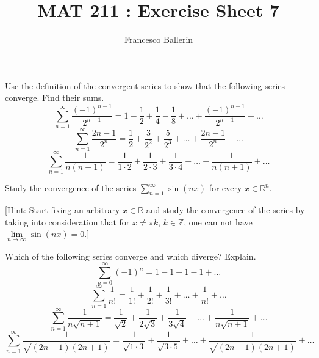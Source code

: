 \documentclass[11pt]{article}%
\title{MAT 211 : Exercise Sheet 7}
\author{Francesco Ballerin}
\date{\color{gray}{\small{francesco.ballerin@uib.no}}}
\begin{document}
\begin{minipage}[t]{\dimexpr \textwidth-6cm-\columnsep}
     \maketitle
\end{minipage}
\hfill\noindent{}

\vspace{50pt}

\begin{Exercise}[title=**$\dagger$] Use the definition of the convergent series to show that the following series converge. Find their sums. $$\sum_{n=1}^{\infty}\frac{(-1)^{n-1}}{2^{n-1}}=1-\frac{1}{2}+\frac{1}{4}-\frac{1}{8}+\ldots+\frac{(-1)^{n-1}}{2^{n-1}}+\ldots$$ $$\sum_{n=1}^{\infty}\frac{2n-1}{2^n}=\frac{1}{2}+\frac{3}{2^2}+\frac{5}{2^3}+\ldots+\frac{2n-1}{2^n}+\ldots$$ $$\sum_{n=1}^{\infty}\frac{1}{n(n+1)}=\frac{1}{1\cdot 2}+\frac{1}{2\cdot 3}+\frac{1}{3\cdot 4}+\ldots+\frac{1}{n(n+1)}+\ldots$$
\end{Exercise}

\begin{Exercise}[title=*] Study the convergence of the series $\sum_{n=1}^{\infty}\sin (nx)$ for every $x\in\mathbb R^n$. 
\end{Exercise}


[Hint: Start fixing an arbitrary $x\in\mathbb R$ and study the convergence of the series by taking into consideration that for $x\neq \pi k$, $k\in\mathbb Z$, one can not have $\lim\limits_{n\to\infty}\sin(nx)=0$.]
\bigskip

\begin{Exercise}[title=**$\dagger$]
	Which of the following series converge and which diverge? Explain. $$\sum_{n=0}^{\infty}(-1)^n=1-1+1-1+\ldots$$ $$\sum_{n=1}^{\infty}\frac{1}{n!}=\frac{1}{1!}+\frac{1}{2!}+\frac{1}{3!}+\ldots+\frac{1}{n!}+\ldots$$ $$\sum_{n=1}^{\infty}\frac{1}{n\sqrt{n+1}}=\frac{1}{\sqrt 2}+\frac{1}{2\sqrt 3}+\frac{1}{3\sqrt 4}+\ldots+\frac{1}{n\sqrt{n+1}}+\ldots$$ $$\sum_{n=1}^{\infty}\frac{1}{\sqrt{(2n-1)(2n+1)}}=\frac{1}{\sqrt {1\cdot 3}}+\frac{1}{\sqrt {3\cdot 5}}+\ldots+\frac{1}{\sqrt{(2n-1)(2n+1)}}+\ldots$$
\end{Exercise}
\end{document}
